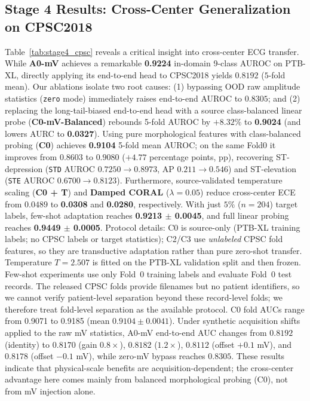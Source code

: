 \documentclass[preprint,12pt]{elsarticle}
\begin{document}
\subsection{Stage 4 Results: Cross-Center Generalization on CPSC2018}
Table~\ref{tab:stage4_cpsc} reveals a critical insight into cross-center ECG transfer. While \textbf{A0-mV} achieves a remarkable \textbf{0.9224} in-domain 9-class AUROC on PTB-XL, directly applying its end-to-end head to CPSC2018 yields $0.8192$ ($5$-fold mean). Our ablations isolate two root causes: (1) bypassing OOD raw amplitude statistics (\texttt{zero} mode) immediately raises end-to-end AUROC to $0.8305$; and (2) replacing the long-tail-biased end-to-end head with a source class-balanced linear probe (\textbf{C0-mV-Balanced}) rebounds 5-fold AUROC by $+8.32\%$ to \textbf{0.9024} (and lowers AURC to \textbf{0.0327}). Using pure morphological features with class-balanced probing (\textbf{C0}) achieves \textbf{0.9104} 5-fold mean AUROC; on the same Fold0 it improves from $0.8603$ to $0.9080$ ($+4.77$ percentage points, pp), recovering ST-depression (\texttt{STD} AUROC $0.7250 \to \mathbf{0.8973}$, AP $0.211 \to \mathbf{0.546}$) and ST-elevation (\texttt{STE} AUROC $0.6700 \to \mathbf{0.8123}$). Furthermore, source-validated temperature scaling (\textbf{C0 + T}) and \textbf{Damped CORAL} ($\lambda=0.05$) reduce cross-center ECE from $0.0489$ to \textbf{0.0308} and \textbf{0.0280}, respectively. With just $5\%$ ($n=204$) target labels, few-shot adaptation reaches \textbf{0.9213 $\pm$ 0.0045}, and full linear probing reaches \textbf{0.9449 $\pm$ 0.0005}. Protocol details: C0 is source-only (PTB-XL training labels; no CPSC labels or target statistics); C2/C3 use {\em unlabeled} CPSC fold features, so they are transductive adaptation rather than pure zero-shot transfer. Temperature $T=2.507$ is fitted on the PTB-XL validation split and then frozen. Few-shot experiments use only Fold~0 training labels and evaluate Fold~0 test records. The released CPSC folds provide filenames but no patient identifiers, so we cannot verify patient-level separation beyond these record-level folds; we therefore treat fold-level separation as the available protocol. C0 fold AUCs range from 0.9071 to 0.9185 (mean $0.9104 \pm 0.0041$). Under synthetic acquisition shifts applied to the raw mV statistics, A0-mV end-to-end AUC changes from $0.8192$ (identity) to $0.8170$ (gain $0.8\times$), $0.8182$ ($1.2\times$), $0.8112$ (offset $+0.1$ mV), and $0.8178$ (offset $-0.1$ mV), while zero-mV bypass reaches $0.8305$. These results indicate that physical-scale benefits are acquisition-dependent; the cross-center advantage here comes mainly from balanced morphological probing (C0), not from mV injection alone.
\end{document}
